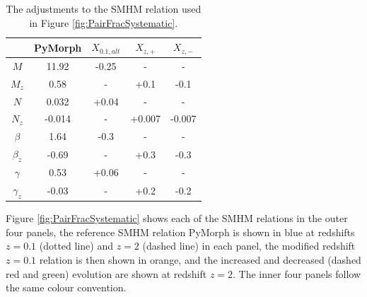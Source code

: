 \begin{table}
\centering
\caption{The adjustments to the SMHM relation used in Figure \ref{fig:PairFracSystematic}.}
\label{tab:PairFracSysInput}
\begin{tabular}{|c|cccc|} \hline
             & PyMorph   & $X_{0.1, alt}$  & $X_{z, +}$  & $X_{z, -}$  \\ \hline
$M$          & 11.92 & -0.25 & -     & -     \\ 
$M_{z}$      & 0.58   & -     & +0.1  & -0.1  \\ \hline
$N$          & 0.032 & +0.04 & -     & -     \\
$N_{z}$      & -0.014 & -     & +0.007 & -0.007 \\ \hline
$\beta$      & 1.64  & -0.3  & -     & -     \\
$\beta_{z}$  & -0.69  & -     & +0.3  & -0.3  \\ \hline
$\gamma$     & 0.53  & +0.06 & -     & -     \\
$\gamma_{z}$ & -0.03  & -     & +0.2  & -0.2  \\ \hline
\end{tabular}
\end{table}

Figure \ref{fig:PairFracSystematic} shows each of the SMHM relations in the outer four panels, the reference SMHM relation PyMorph is shown in blue at redshifts $z = 0.1$ (dotted line) and $z = 2$ (dashed line) in each panel, the modified redshift $z = 0.1$ relation is then shown in orange, and the increased and decreased (dashed red and green) evolution are shown at redshift $z = 2$. The inner four panels follow the same colour convention. 

